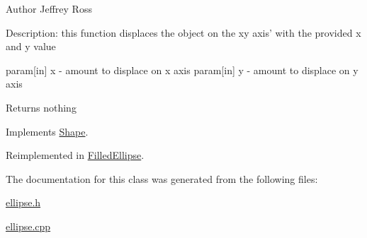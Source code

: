 \begin{DoxyAuthor}{Author}
Jeffrey Ross
\end{DoxyAuthor}
\begin{DoxyParagraph}{Description\-:}
this function displaces the object on the xy axis' with the provided x and y value
\end{DoxyParagraph}
param\mbox{[}in\mbox{]} x -\/ amount to displace on x axis param\mbox{[}in\mbox{]} y -\/ amount to displace on y axis

\begin{DoxyReturn}{Returns}
nothing 
\end{DoxyReturn}


Implements \hyperlink{classShape_a140551e1a4fc2c4d8cf8d2e01c5a5932}{Shape}.



Reimplemented in \hyperlink{classFilledEllipse_a3fd1d3d0b506716399ec543a32a3c450}{Filled\-Ellipse}.



The documentation for this class was generated from the following files\-:\begin{DoxyCompactItemize}
\item 
\hyperlink{ellipse_8h}{ellipse.\-h}\item 
\hyperlink{ellipse_8cpp}{ellipse.\-cpp}\end{DoxyCompactItemize}
